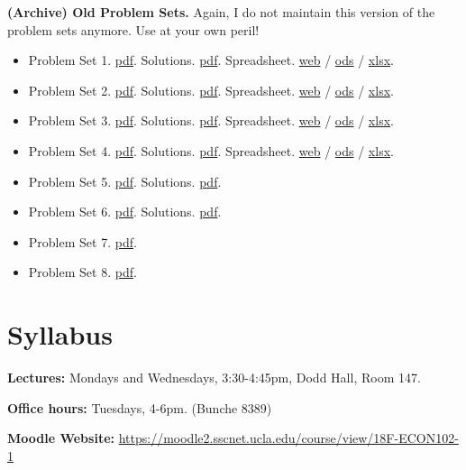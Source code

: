 \documentclass[]{book}
\providecommand{\tightlist}{%
  \setlength{\itemsep}{0pt}\setlength{\parskip}{0pt}}
\theoremstyle{definition}
\theoremstyle{definition}
\theoremstyle{definition}
\theoremstyle{remark}
\begin{document}
\textbf{(Archive) Old Problem Sets.} Again, I do not maintain this
version of the problem sets anymore. Use at your own peril!

\begin{itemize}
\tightlist
\item
  Problem Set 1. \href{old/pset1.pdf}{pdf}. Solutions.
  \href{old/pset1-sol.pdf}{pdf}. Spreadsheet.
  \href{https://docs.google.com/spreadsheets/d/108I8xuosIQvgU6wOGrfwzHhE4p1OStgv8iIpzZ-4vME/edit?usp=sharing}{web}
  / \href{old/pset1-sol.ods}{ods} / \href{old/pset1-sol.xlsx}{xlsx}.
\item
  Problem Set 2. \href{old/pset2.pdf}{pdf}. Solutions.
  \href{old/pset2-sol.pdf}{pdf}. Spreadsheet.
  \href{https://docs.google.com/spreadsheets/d/1dkygwhDNT79cU_mTVXWal4RyGwX38OTnu5iS5UTz1fc/edit?usp=sharing}{web}
  / \href{old/pset2-sol.ods}{ods} / \href{old/pset2-sol.xlsx}{xlsx}.
\item
  Problem Set 3. \href{old/pset3.pdf}{pdf}. Solutions.
  \href{old/pset3-sol.pdf}{pdf}. Spreadsheet.
  \href{https://docs.google.com/spreadsheets/d/1dDFa5YZE5170Tv36klHQ19ykK2bP9wjeR0Y1_h-kacg/edit?usp=sharing}{web}
  / \href{old/pset3-sol.ods}{ods} / \href{old/pset3-sol.xlsx}{xlsx}.
\item
  Problem Set 4. \href{old/pset4.pdf}{pdf}. Solutions.
  \href{old/pset4-sol.pdf}{pdf}. Spreadsheet.
  \href{https://docs.google.com/spreadsheets/d/1h9JJD8K2_IE166gdj78waf0zu4YDY9Rp3r5oiJR_06s/edit?usp=sharing}{web}
  / \href{old/pset4-sol.ods}{ods} / \href{old/pset4-sol.xlsx}{xlsx}.
\item
  Problem Set 5. \href{old/pset5.pdf}{pdf}. Solutions.
  \href{old/pset5-sol.pdf}{pdf}.
\item
  Problem Set 6. \href{old/pset6.pdf}{pdf}. Solutions.
  \href{old/pset6-sol.pdf}{pdf}.
\item
  Problem Set 7. \href{old/pset7.pdf}{pdf}.
\item
  Problem Set 8. \href{old/pset8.pdf}{pdf}.
\end{itemize}

\chapter*{Syllabus}\label{syllabus}

\textbf{Lectures:} Mondays and Wednesdays, 3:30-4:45pm, Dodd Hall, Room
147.

\textbf{Office hours:} Tuesdays, 4-6pm. (Bunche 8389)

\textbf{Moodle Website:}
\url{https://moodle2.sscnet.ucla.edu/course/view/18F-ECON102-1}
\end{document}
